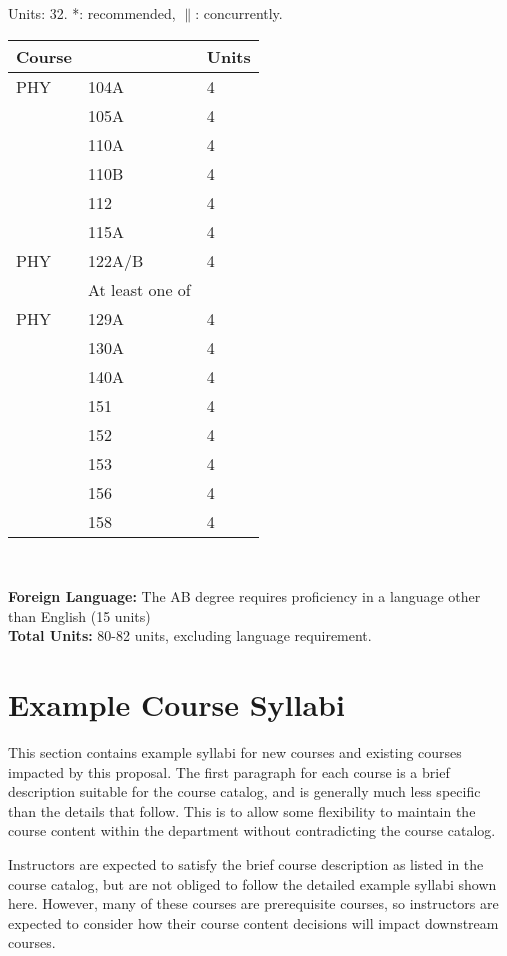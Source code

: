 \documentclass[12pt]{article}
\begin{document}
\noindent
\vskip 0.25cm
\begin{center}
Units:  32. *: recommended, $\parallel$: concurrently.\\
\begin{tabular}{|lll|}
\hline
Course & & Units \\
\hline
PHY & 104A & 4 \\
    & 105A & 4 \\
    & 110A & 4 \\
    & 110B & 4 \\
    & 112  & 4 \\
    & 115A & 4 \\
\hline
\hline
PHY & 122A/B & 4 \\
\hline
    & At least one of & \\ 
\hline
PHY & 129A & 4 \\
    & 130A & 4 \\
    & 140A & 4 \\
    & 151 & 4 \\
    & 152 & 4 \\
    & 153 & 4 \\
    & 156 & 4 \\
    & 158 & 4 \\
\hline
\end{tabular}\\ \vskip 0.25cm
\end{center}
\noindent
{\bf Foreign Language:} The AB degree requires proficiency in a language other than English (15 units)\\
\noindent
{\bf Total Units:} 80-82 units, excluding language requirement.
\newpage
\section{Example Course Syllabi}
\label{sec:syllabi}

This section contains example syllabi for new courses and existing
courses impacted by this proposal.  The first paragraph for each
course is a brief description suitable for the course catalog, and is
generally much less specific than the details that follow.  This is to
allow some flexibility to maintain the course content within the
department without contradicting the course catalog.

Instructors are expected to satisfy the brief course description as
listed in the course catalog, but are not obliged to follow the
detailed example syllabi shown here.  However, many of these courses
are prerequisite courses, so instructors are expected to consider how
their course content decisions will impact downstream courses.
\end{document}
